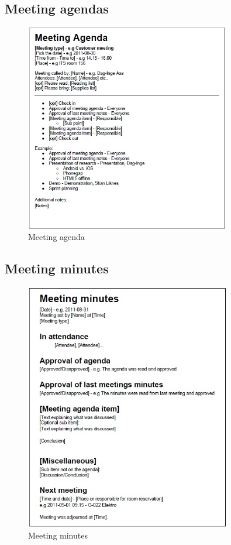 	\subsection{Meeting agendas}
		\begin{figure}[htb]
			\centering
			\includegraphics[width=0.8\textwidth]{appendix/meeting_agenda.jpg}
			\caption{Meeting agenda}
			\label{fig:meeting-agenda}
		\end{figure}
	
	\newpage
	\subsection{Meeting minutes}
		\begin{figure}[htb]
			\centering
			\includegraphics[width=0.8\textwidth]{appendix/meeting_minutes.jpg}
			\caption{Meeting minutes}
			\label{fig:meeting-minutes}
		\end{figure}
	
